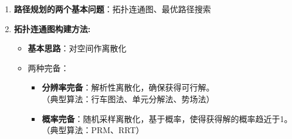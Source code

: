 \documentclass[../main.tex]{subfiles}
\begin{document}
\begin{enumerate}
\begin{itemize}
        \end{itemize}
    \item \textbf{路径规划的两个基本问题}：拓扑连通图、最优路径搜索
    \item \textbf{拓扑连通图构建方法:}
    \begin{itemize}
        \item \textbf{基本思路}：对空间作离散化
        \item {两种完备}：
            \begin{itemize}
                \item \textbf{分辨率完备}：解析性离散化，确保获得可行解。
                \\{\small\kaishu （典型算法：行车图法、单元分解法、势场法）}
                \item \textbf{概率完备}：随机采样离散化，基于概率，使得获得解的概率趋近于1。
                \\{\small\kaishu （典型算法：PRM、RRT）}
            \end{itemize}
    \end{itemize}
\end{enumerate}
\end{document}
